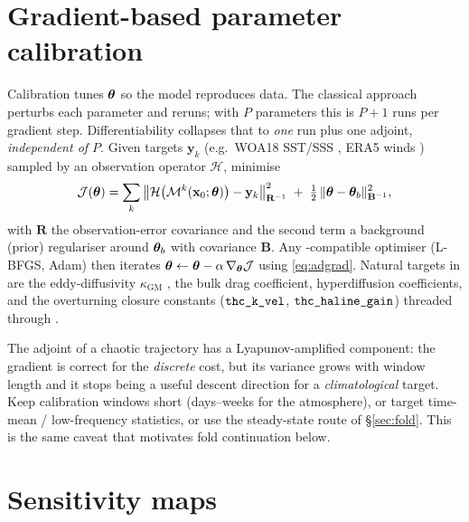 \section{Gradient-based parameter calibration}

Calibration tunes $\boldsymbol{\theta}$ so the model reproduces data. The classical
approach perturbs each parameter and reruns; with $P$ parameters this is
$P{+}1$ runs per gradient step. Differentiability collapses that to \emph{one}
run plus one adjoint, \emph{independent of $P$}. Given targets
$\mathbf{y}_k$ (e.g.\ WOA18 SST/SSS \citep{locarnini2018woa,zweng2018woa}, ERA5 winds \citep{hersbach2020era5}) sampled by an observation
operator $\mathcal{H}$, minimise
\begin{equation}
  \mathcal{J}(\boldsymbol{\theta})
  = \sum_k \big\lVert \mathcal{H}\big(\mathcal{M}^{k}(\mathbf{x}_0;\boldsymbol{\theta})\big)
      - \mathbf{y}_k \big\rVert^{2}_{\mathbf{R}^{-1}}
  \;+\; \tfrac12\,\lVert \boldsymbol{\theta} - \boldsymbol{\theta}_b\rVert^{2}_{\mathbf{B}^{-1}},
  \label{eq:calib}
\end{equation}
with $\mathbf{R}$ the observation-error covariance and the second term a
background (prior) regulariser around $\boldsymbol{\theta}_b$ with covariance $\mathbf{B}$.
Any \jax{}-compatible optimiser (L-BFGS, Adam) then iterates
$\boldsymbol{\theta} \leftarrow \boldsymbol{\theta} - \alpha\,\nabla_{\boldsymbol{\theta}}\mathcal{J}$ using
\eqref{eq:adgrad}. Natural targets in \model{} are the eddy-diffusivity
$\kappa_{\mathrm{GM}}$ \citep{gentmcwilliams1990}, the bulk drag coefficient,
hyperdiffusion coefficients, and the overturning closure constants
($\texttt{thc\_k\_vel}$, $\texttt{thc\_haline\_gain}$) threaded through
.

\begin{remark}
The adjoint of a chaotic trajectory has a Lyapunov-amplified component: the
gradient is correct for the \emph{discrete} cost, but its variance grows with
window length and it stops being a useful descent direction for a
\emph{climatological} target. Keep calibration windows short (days--weeks for the
atmosphere), or target time-mean / low-frequency statistics, or use the
steady-state route of \S\ref{sec:fold}. This is the same caveat that motivates
fold continuation below.
\end{remark}

\section{Sensitivity maps}

